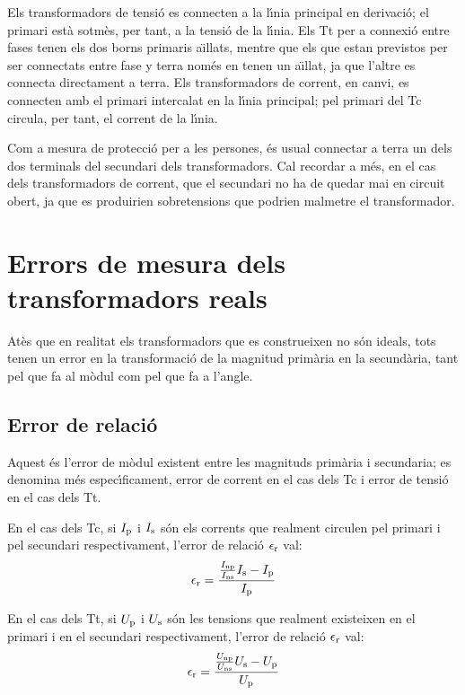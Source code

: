 Els transformadors de tensi\'{o} es connecten a la l\'{\i}nia principal en
derivaci\'{o}; el  primari est\`{a} sotm\`{e}s, per tant, a la tensi\'{o} de la
l\'{\i}nia. Els Tt per a connexi\'{o} entre fases tenen els dos borns
primaris a\"{\i}llats, mentre que els que estan previstos per ser
connectats entre fase y terra nom\'{e}s en tenen un a\"{\i}llat, ja que
l'altre es connecta directament a terra. Els transformadors de
corrent, en canvi, es connecten amb el primari intercalat en la
l\'{\i}nia principal;  pel primari del Tc circula, per tant, el corrent
 de la l\'{\i}nia.

 Com a mesura de protecci\'{o} per a les persones, \'{e}s usual
connectar a terra un dels dos terminals del secundari dels
transformadors. Cal recordar a m\'{e}s, en el cas dels transformadors de
corrent, que el secundari no ha de quedar mai en circuit obert, ja
que es produirien sobretensions que podrien malmetre el
transformador.

\section{Errors de mesura dels transformadors reals}

At\`{e}s que en realitat els transformadors que es construeixen no s\'{o}n
ideals, tots tenen un error en la transformaci\'{o} de la magnitud
prim\`{a}ria en la secund\`{a}ria, tant pel que fa al m\`{o}dul com pel que fa
a l'angle.

\subsection{Error de relaci\'{o}}

Aquest \'{e}s l'error de m\`{o}dul existent entre les magnituds prim\`{a}ria i
secundaria; es denomina m\'{e}s espec\'{\i}ficament, error de corrent en el
cas dels Tc i error de tensi\'{o} en el cas dels Tt.

En el cas dels Tc, si $I_\mathrm{p}$ i $I_\mathrm{s}$ s\'{o}n els corrents que
realment circulen pel primari i pel secundari respectivament,
l'error de relaci\'{o} $\epsilon_\mathrm{r}$ val:
\begin{equation}
    \epsilon_\mathrm{r} = \frac{\frac{I_\mathrm{np}}{I_\mathrm{ns}} I_\mathrm{s} - I_\mathrm{p}} {I_\mathrm{p}}
\end{equation}

En el cas dels Tt, si $U_\mathrm{p}$ i $U_\mathrm{s}$ s\'{o}n les tensions que
realment existeixen en el primari i en el secundari respectivament,
l'error de relaci\'{o} $\epsilon_\mathrm{r}$ val:
\begin{equation}
    \epsilon_\mathrm{r} = \frac{\frac{U_\mathrm{np}}{U_\mathrm{ns}} U_\mathrm{s} - U_\mathrm{p}} {U_\mathrm{p}}
\end{equation}

